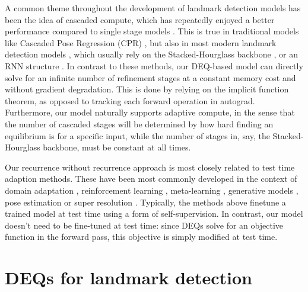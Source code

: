 \documentclass[10pt,twocolumn,letterpaper]{article}
\begin{document}
A common theme throughout the development of landmark detection models has been the idea of cascaded compute, which has repeatedly enjoyed a better performance compared to single stage models \cite{Wang2018DeepFaceRecognitionSurvey2}. This is true in traditional models like Cascaded Pose Regression (CPR) \cite{Dollar2010CascadedPoseRegression, Xudong2012ExplicitShapeRegression, Xiong2013SupervisedDescentMethod, Sun2013ConvolutionalCascade, Asthana2014IncrementalFaceAlignment}, but also in most modern landmark detection models \cite{YangStackedHourglassForFacialLandmark, Wayne2018LookAtBoundary, Wan2020MultiOrderHG, Kumar2020Luvli, Wang2019AdaptiveWingLoss, Huang2021ADNet, Lan2021HIH}, which usually rely on the Stacked-Hourglass backbone \cite{Newell2016StackedHourglass}, or an RNN structure \cite{Trigeorgis2016MnemonicDescentMethod, Hanjiang2018DeepRecurrentRegression}. In contrast to these methods, our DEQ-based model can directly solve for an infinite number of refinement stages at a constant memory cost and without gradient degradation. This is done by relying on the implicit function theorem, as opposed to tracking each forward operation in autograd. Furthermore, our model naturally supports adaptive compute, in the sense that the number of cascaded stages will be determined by how hard finding an equilibrium is for a specific input, while the number of stages in, say, the Stacked-Hourglass backbone, must be constant at all times.

Our recurrence without recurrence approach is most closely related to test time adaption methods. These have been most commonly developed in the context of domain adaptation \cite{Sun2020TestTimeTraining, Wang2021TestTimeAdaptationByEntropyMinimization}, reinforcement learning \cite{Hansen2021SelfSupervisedPolicy}, meta-learning \cite{Zhang2021AdaptiveRiskMinimization}, generative models \cite{Jiang2021HandObjectGeneration, Mu2021ArticulatedShapeRepresentation}, pose estimation \cite{Li2021TestTimePoseEstimation} or super resolution \cite{Assaf2018ZeroShotSuperResolution}. Typically, the methods above finetune a trained model at test time using a form of self-supervision. In contrast, our model doesn't need to be fine-tuned at test time: since DEQs solve for an objective function in the forward pass, this objective is simply modified at test time.

\section{DEQs for landmark detection}
\label{sec: deq formulation}
\end{document}

